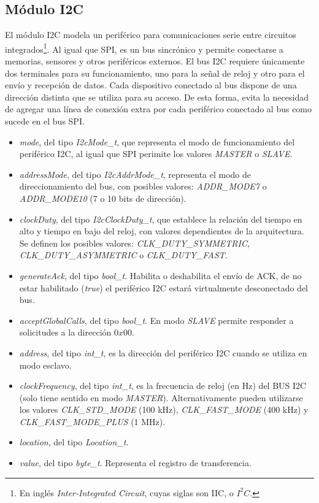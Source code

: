 \subsection{Módulo I2C}

El módulo I2C modela un periférico para comunicaciones serie entre circuitos integrados\footnote{En inglés \emph{Inter-Integrated Circuit}, cuyas siglas son IIC, o $I^{2}C$.}. Al igual que SPI, es un bus sincrónico y permite conectarse a memorias, sensores y otros periféricos externos. El bus I2C requiere únicamente dos terminales para su funcionamiento, uno para la señal de reloj y otro para el envío y recepción de datos. Cada dispositivo conectado al bus dispone de una dirección distinta que se utiliza para su acceso. De esta forma, evita la necesidad de agregar una línea de conexión extra por cada periférico conectado al bus como sucede en el bus SPI.


\begin{itemize}
\item
\emph{mode}, del tipo \emph{I2cMode\_t}, que representa el modo de funcionamiento del periférico I2C, al igual que SPI perimite los valores \emph{MASTER} o \emph{SLAVE}.
\item
\emph{addressMode}, del tipo \emph{I2cAddrMode\_t}, representa el modo de direccionamiento del bus, con posibles valores: \emph{ADDR\_MODE7} o \emph{ADDR\_MODE10} (7 o 10 bits de dirección).
\item
\emph{clockDuty}, del tipo \emph{I2cClockDuty\_t}, que establece la relación del tiempo en alto y tiempo en bajo del reloj, con valores dependientes de la arquitectura. Se definen los posibles valores: \emph{CLK\_DUTY\_SYMMETRIC}, \emph{CLK\_DUTY\_ASYMMETRIC} o \emph{CLK\_DUTY\_FAST}.
\item
\emph{generateAck}, del tipo \emph{bool\_t}. Habilita o deshabilita el envío de ACK, de no estar habilitado (\emph{true}) el periférico I2C estará virtualmente desconectado del bus.
\item
\emph{acceptGlobalCalls}, del tipo \emph{bool\_t}. En modo \emph{SLAVE} permite responder a solicitudes a la dirección $0x00$.
\item
\emph{address}, del tipo \emph{int\_t}, es la dirección del periférico I2C cuando se utiliza en modo esclavo.
\item
\emph{clockFrequency}, del tipo \emph{int\_t}, es la frecuencia de reloj (en Hz) del BUS I2C (solo tiene sentido en modo \emph{MASTER}). Alternativamente pueden utilizarse los valores \emph{CLK\_STD\_MODE} (100 kHz), \emph{CLK\_FAST\_MODE} (400 kHz) y \emph{CLK\_FAST\_MODE\_PLUS} (1 MHz).
\item
\emph{location}, del tipo \emph{Location\_t}.
\item
\emph{value}, del tipo \emph{byte\_t}. Representa el registro de transferencia.
\end{itemize}

